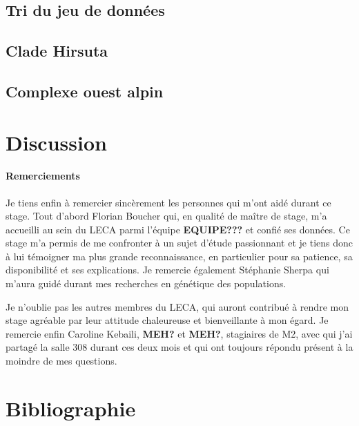\documentclass[12pt,a4paper,notitlepage]{article}
\begin{document}
\subsection{Tri du jeu de données}

\lipsum[1-2]

\subsection{Clade Hirsuta}

\lipsum[1]

\subsection{Complexe ouest alpin}

\lipsum[1]

\section{Discussion}

\lipsum[1-4]

\paragraph{Remerciements}
Je tiens enfin à remercier sincèrement les personnes qui m'ont aidé durant ce stage.
Tout d'abord Florian Boucher qui, en qualité de maître de stage, m'a accueilli au sein du LECA parmi l'équipe \textbf{EQUIPE???} et confié ses données.
Ce stage m'a permis de me confronter à un sujet d'étude passionnant et je tiens donc à lui témoigner ma plus grande reconnaissance, en particulier pour sa patience, sa disponibilité et ses explications. Je remercie également Stéphanie Sherpa qui m'aura guidé durant mes recherches en génétique des populations.

Je n’oublie pas les autres membres du LECA, qui auront contribué à rendre mon stage agréable par leur attitude chaleureuse et bienveillante à mon égard.
Je remercie enfin Caroline Kebaili, \textbf{MEH?} et \textbf{MEH?}, stagiaires de M2, avec qui j’ai partagé la salle 308 durant ces deux mois et qui ont toujours répondu présent à la moindre de mes questions.

\newpage
\section{Bibliographie}


\end{document}

